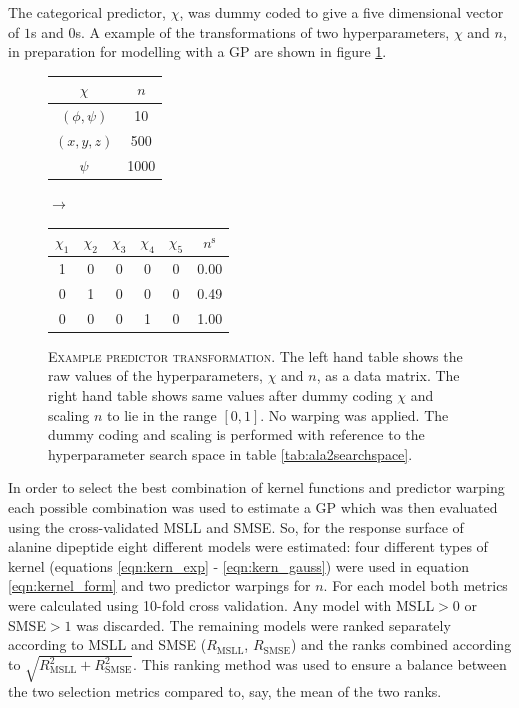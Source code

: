 The categorical predictor, $\chi$, was dummy coded\cite{dalyDummyCodingVs2016} to give a five dimensional vector of $1$s and $0$s.  A example of the transformations of two hyperparameters, $\chi$ and $n$, in preparation for modelling with a GP are shown in figure \ref{fig:msm_eg_transform}. 

\begin{figure}
    \centering
    \caption[Example predictor transformation]{\textsc{Example predictor transformation}. The left hand table shows the raw values of the hyperparameters, $\chi$ and $n$, as a data matrix. The right hand table shows same values after dummy coding $\chi$ and scaling $n$ to lie in the range $[0, 1]$. No warping was applied. The dummy coding and scaling is performed with reference to the hyperparameter search space in table \ref{tab:ala2searchspace}.}
    \begin{tabular}{cc}
        \toprule
        $\chi$    &  $n$ \\
        \midrule
        $(\phi, \psi)$    &  10 \\
        $(x, y, z)$ & 500 \\
        $\psi$  & 1000 \\
        \bottomrule
        \end{tabular}
    $\longrightarrow $
    \begin{tabular}{cccccc}
        \toprule
        $\chi_{1}$ &$\chi_{2}$ &$\chi_{3}$ &$\chi_{4}$ &$\chi_{5}$ &  $n^{\mathrm{s}}$ \\
        \midrule
        1 & 0 & 0 & 0 & 0  &  \num{0.00} \\
        0 & 1 & 0 & 0 & 0  &  \num{0.49} \\
        0 & 0 & 0 & 1 & 0  &  \num{1.00} \\
        \bottomrule
    \end{tabular} 
    \label{fig:msm_eg_transform}
\end{figure}

In order to select the best combination of kernel functions and predictor warping each possible combination was used to estimate a GP which was then evaluated using the cross-validated MSLL and SMSE. So, for the response surface of alanine dipeptide eight different models were estimated: four different types of kernel (equations \ref{eqn:kern_exp} - \ref{eqn:kern_gauss}) were used in equation \ref{eqn:kernel_form} and two predictor warpings for $n$. For each model both metrics were calculated using 10-fold cross validation. Any model with MSLL$ > 0$ or SMSE$ > 1$ was discarded. The remaining models were ranked separately according to MSLL and SMSE ($R_{\mathrm{MSLL}}$, $R_{\mathrm{SMSE}}$) and the ranks combined according to $\sqrt{R_{\mathrm{MSLL}}^2 + R_{\mathrm{SMSE}}^2}$. This ranking method was used to ensure a balance between the two selection metrics compared to, say, the mean of the two ranks.  

